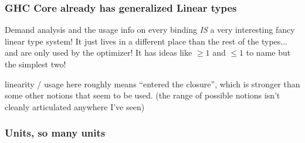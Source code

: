 \documentclass[11pt,reqno]{beamer}
\begin{document}
\begin{frame}\frametitle{GHC Core already has generalized Linear types}

Demand analysis and the usage info on every binding \emph{IS} a very interesting
fancy linear type system! It just lives in a different place than the rest of the
types... and are only used by the optimizer! It has ideas like \( \geq1 \) and \( \leq 1 \)
to name but the simplest two!

linearity / usage here roughly means ``entered the closure'', which is stronger
than some other notions that seem to be used.
(the range of possible notions isn't cleanly articulated anywhere I've seen)

\end{frame}


\begin{frame}\frametitle{Units, so many units}



\end{frame}

%





\end{document}
